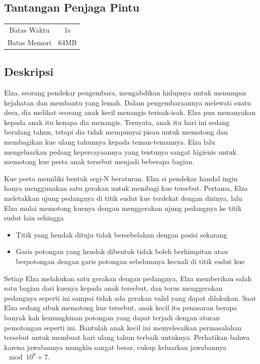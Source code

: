 \documentclass{article}
\begin{document}
\begin{center}
    \section*{Tantangan Penjaga Pintu} %

    \begin{tabular}{ | c c | }
        \hline
        Batas Waktu  & 1s \\    %
        Batas Memori & 64MB \\  %
        \hline
    \end{tabular}
\end{center}

\subsection*{Deskripsi}

Elza, seorang pendekar pengembara, mengabdikan hidupnya untuk menumpas kejahatan dan membantu yang lemah. Dalam pengembaraannya melewati suatu desa, dia melihat seorang anak kecil menangis terisak-isak. Elza pun menanyakan kepada anak itu kenapa dia menangis. Ternyata, anak itu hari ini sedang berulang tahun, tetapi dia tidak mempunyai pisau untuk memotong dan membagikan kue ulang tahunnya kepada teman-temannya. Elza lalu mengeluarkan pedang kepercayaannya yang tentunya sangat higienis untuk memotong kue pesta anak tersebut menjadi beberapa bagian.

Kue pesta memiliki bentuk segi-N beraturan. Elza si pendekar handal ingin hanya menggunakan satu gerakan untuk membagi kue tersebut. Pertama, Elza meletakkan ujung pedangnya di titik sudut kue terdekat dengan dirinya, lalu Elza mulai memotong kuenya dengan menggerakan ujung pedangnya ke titik sudut lain sehingga

\begin{itemize}
    \setlength\itemsep{0pt}
    \item Titik yang hendak dituju tidak bersebelahan dengan posisi sekarang
    \item Garis potongan yang hendak dibentuk tidak boleh berhimpitan atau berpotongan dengan garis potongan sebelumnya kecuali di titik sudut kue
\end{itemize}

Setiap Elza melakukan satu gerakan dengan pedangnya, Elza memberikan salah satu bagian dari kuenya kepada anak tersebut, dan terus menggerakan pedangnya seperti ini sampai tidak ada gerakan valid yang dapat dilakukan. Saat Elza sedang sibuk memotong kue tersebut, anak kecil itu penasaran berapa banyak kah kemungkinan potongan yang dapat terjadi dengan aturan pemotongan seperti ini. Bantulah anak kecil ini menyelesaikan permasalahan tersebut untuk membuat hari ulang tahun terbaik untuknya. Perhatikan bahwa karena jawabannya mungkin sangat besar, cukup keluarkan jawabannya $\mod 10^9 + 7$.
\end{document}
